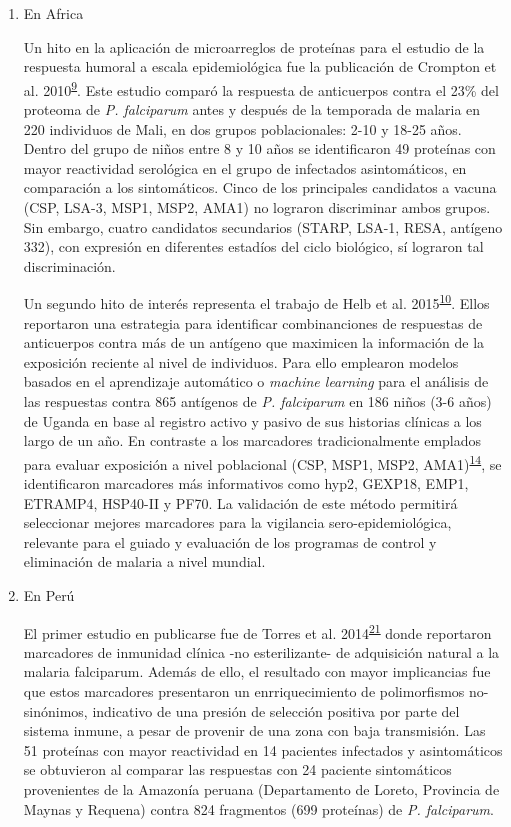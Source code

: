 \documentclass[]{article}
\begin{document}
\begin{enumerate}
\def\labelenumi{\alph{enumi}.}
\item
  En Africa

  Un hito en la aplicación de microarreglos de proteínas para el estudio
  de la respuesta humoral a escala epidemiológica fue la publicación de
  Crompton et al.
  2010\textsuperscript{\protect\hyperlink{ref-crompton2010}{9}}. Este
  estudio comparó la respuesta de anticuerpos contra el 23\% del
  proteoma de \emph{P. falciparum} antes y después de la temporada de
  malaria en 220 individuos de Mali, en dos grupos poblacionales: 2-10 y
  18-25 años. Dentro del grupo de niños entre 8 y 10 años se
  identificaron 49 proteínas con mayor reactividad serológica en el
  grupo de infectados asintomáticos, en comparación a los sintomáticos.
  Cinco de los principales candidatos a vacuna (CSP, LSA-3, MSP1, MSP2,
  AMA1) no lograron discriminar ambos grupos. Sin embargo, cuatro
  candidatos secundarios (STARP, LSA-1, RESA, antígeno 332), con
  expresión en diferentes estadíos del ciclo biológico, sí lograron tal
  discriminación.

  Un segundo hito de interés representa el trabajo de Helb et al.
  2015\textsuperscript{\protect\hyperlink{ref-Helb2015exposure}{10}}.
  Ellos reportaron una estrategia para identificar combinanciones de
  respuestas de anticuerpos contra más de un antígeno que maximicen la
  información de la exposición reciente al nivel de individuos. Para
  ello emplearon modelos basados en el aprendizaje automático o
  \emph{machine learning} para el análisis de las respuestas contra 865
  antígenos de \emph{P. falciparum} en 186 niños (3-6 años) de Uganda en
  base al registro activo y pasivo de sus historias clínicas a los largo
  de un año. En contraste a los marcadores tradicionalmente emplados
  para evaluar exposición a nivel poblacional (CSP, MSP1, MSP2,
  AMA1)\textsuperscript{\protect\hyperlink{ref-elliott2014}{14}}, se
  identificaron marcadores más informativos como hyp2, GEXP18, EMP1,
  ETRAMP4, HSP40-II y PF70. La validación de este método permitirá
  seleccionar mejores marcadores para la vigilancia sero-epidemiológica,
  relevante para el guiado y evaluación de los programas de control y
  eliminación de malaria a nivel mundial.
\item
  En Perú

  El primer estudio en publicarse fue de Torres et al.
  2014\textsuperscript{\protect\hyperlink{ref-Torres2014asymptomatic}{21}}
  donde reportaron marcadores de inmunidad clínica -no esterilizante- de
  adquisición natural a la malaria falciparum. Además de ello, el
  resultado con mayor implicancias fue que estos marcadores presentaron
  un enrriquecimiento de polimorfismos no-sinónimos, indicativo de una
  presión de selección positiva por parte del sistema inmune, a pesar de
  provenir de una zona con baja transmisión. Las 51 proteínas con mayor
  reactividad en 14 pacientes infectados y asintomáticos se obtuvieron
  al comparar las respuestas con 24 paciente sintomáticos provenientes
  de la Amazonía peruana (Departamento de Loreto, Provincia de Maynas y
  Requena) contra 824 fragmentos (699 proteínas) de \emph{P.
  falciparum}.


\end{enumerate}
\end{document}
